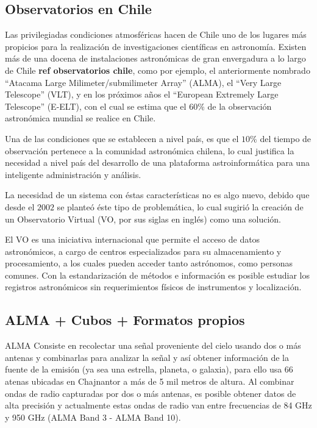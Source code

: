

\subsection{Observatorios en Chile}

Las privilegiadas condiciones atmosféricas hacen de Chile uno de los lugares
más propicios para la realización de investigaciones científicas en astronomía.
Existen más de una docena de instalaciones astronómicas de gran envergadura a
lo largo de Chile {\bf ref observatorios chile}, como por
ejemplo, el anteriormente nombrado ``Atacama Large Milimeter/submilimeter
Array'' (ALMA), el ``Very Large Telescope'' (VLT), y en los próximos años el
``European Extremely Large Telescope'' (E-ELT), con el cual se estima que el
$60\%$ de la observación astronómica mundial se realice en Chile.

Una de las condiciones que se establecen a nivel país, es que el $10\%$ del
tiempo de observación pertenece a la comunidad astronómica chilena, lo cual
justifica la necesidad a nivel país del desarrollo de una plataforma
astroinformática para una inteligente administración y análisis.

La necesidad de un sistema con éstas características no es algo nuevo, debido
que desde el $2002$ se planteó éste tipo de problemática, lo cual sugirió la
creación de un Observatorio Virtual (VO, por sus siglas en inglés) como una
solución.

El VO es una iniciativa internacional que permite el acceso de datos
astronómicos, a cargo de centros especializados para su almacenamiento y
procesamiento, a los cuales pueden acceder tanto astrónomos, como personas
comunes.  Con la estandarización de métodos e información es posible estudiar
los registros astronómicos sin requerimientos físicos de instrumentos y
localización.

\subsection{ALMA + Cubos + Formatos propios}

ALMA Consiste en recolectar una señal proveniente del cielo usando dos o más
antenas y combinarlas para analizar la señal y así obtener información de la
fuente de la emisión (ya sea una estrella, planeta, o galaxia), para ello usa
66 atenas ubicadas en Chajnantor a más de 5 mil metros de altura. Al combinar
ondas de radio capturadas por dos o más antenas, es posible obtener datos de
alta precisión y actualmente estas ondas de radio van entre frecuencias de 84
GHz y 950 GHz (ALMA Band 3 - ALMA Band 10). 

